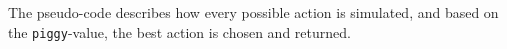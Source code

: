 The pseudo-code describes how every possible action is simulated, and based on the \texttt{piggy}-value, the best action is chosen and returned.


\begin{comment}
Missing:
Behaviour
\end{comment}


%

